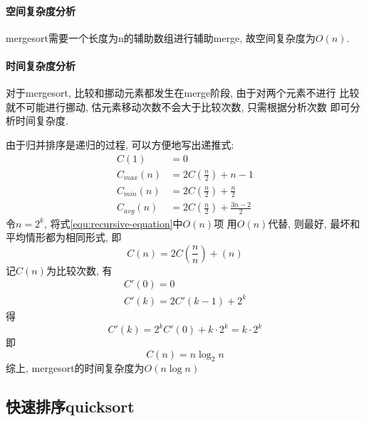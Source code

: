 \paragraph{空间复杂度分析}
mergesort需要一个长度为n的辅助数组进行辅助merge, 故空间复杂度为$O(n)$.

\paragraph{时间复杂度分析}
对于mergesort, 比较和挪动元素都发生在merge阶段, 由于对两个元素不进行
比较就不可能进行挪动, 估元素移动次数不会大于比较次数, 只需根据分析次数
即可分析时间复杂度. \par
由于归并排序是递归的过程, 可以方便地写出递推式:
\begin{align}
	\label{equ:recursive-equation}
	C(1)       & = 0                                \\
	C_{max}(n) & = 2C(\frac{n}{2}) + n-1            \\
	C_{min}(n) & = 2C(\frac{n}{2}) + \frac{n}{2}    \\
	C_{avg}(n) & = 2C(\frac{n}{2}) + \frac{3n-2}{2}
\end{align}
令\(n=2^k\), 将式\ref{equ:recursive-equation}中$O(n)$项
用$O(n)$代替, 则最好, 最坏和平均情形都为相同形式, 即
\begin{equation}
	C(n) = 2C(\frac{n}{n})+(n)
\end{equation}
记$C(n)$为比较次数, 有
\begin{gather}
	\label{equ:recursive_equation_derivation}
	C'(0) = 0            \\
	C'(k) = 2C'(k-1)+2^k
\end{gather}
得
\begin{equation}
	C'(k) = 2^kC'(0)+k\cdot 2^k = k\cdot 2^k
\end{equation}
即
\begin{equation}
	C(n) = n\log_2{n}
\end{equation}
综上, mergesort的时间复杂度为$O(n\log n)$

\subsection{快速排序quicksort}
